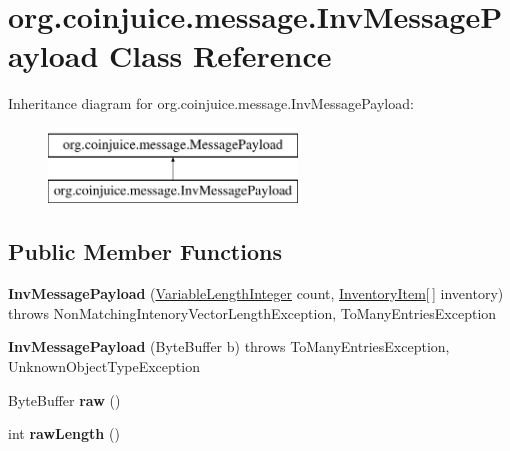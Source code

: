 \hypertarget{classorg_1_1coinjuice_1_1message_1_1_inv_message_payload}{\section{org.\-coinjuice.\-message.\-Inv\-Message\-Payload Class Reference}
\label{classorg_1_1coinjuice_1_1message_1_1_inv_message_payload}
}
Inheritance diagram for org.\-coinjuice.\-message.\-Inv\-Message\-Payload\-:\begin{figure}[H]
\begin{center}
\leavevmode
\includegraphics[height=2.000000cm]{classorg_1_1coinjuice_1_1message_1_1_inv_message_payload}
\end{center}
\end{figure}
\subsection*{Public Member Functions}
\begin{DoxyCompactItemize}
\item 
\hypertarget{classorg_1_1coinjuice_1_1message_1_1_inv_message_payload_a1eff1c0527a718654c72f3c55a3cec8a}{{\bfseries Inv\-Message\-Payload} (\hyperlink{classorg_1_1coinjuice_1_1message_1_1field_1_1_variable_length_integer}{Variable\-Length\-Integer} count, \hyperlink{classorg_1_1coinjuice_1_1message_1_1field_1_1_inventory_item}{Inventory\-Item}\mbox{[}$\,$\mbox{]} inventory)  throws Non\-Matching\-Intenory\-Vector\-Length\-Exception, To\-Many\-Entries\-Exception }\label{classorg_1_1coinjuice_1_1message_1_1_inv_message_payload_a1eff1c0527a718654c72f3c55a3cec8a}

\item 
\hypertarget{classorg_1_1coinjuice_1_1message_1_1_inv_message_payload_aeefbb7fe5e7906a6b11b4df47949e799}{{\bfseries Inv\-Message\-Payload} (Byte\-Buffer b)  throws To\-Many\-Entries\-Exception, Unknown\-Object\-Type\-Exception }\label{classorg_1_1coinjuice_1_1message_1_1_inv_message_payload_aeefbb7fe5e7906a6b11b4df47949e799}

\item 
\hypertarget{classorg_1_1coinjuice_1_1message_1_1_inv_message_payload_a95bf609356317a1ffc8fe755b5f85a69}{Byte\-Buffer {\bfseries raw} ()}\label{classorg_1_1coinjuice_1_1message_1_1_inv_message_payload_a95bf609356317a1ffc8fe755b5f85a69}

\item 
\hypertarget{classorg_1_1coinjuice_1_1message_1_1_inv_message_payload_a69455150dae184d45bca67472a77bbaa}{int {\bfseries raw\-Length} ()}\label{classorg_1_1coinjuice_1_1message_1_1_inv_message_payload_a69455150dae184d45bca67472a77bbaa}

\end{DoxyCompactItemize}
